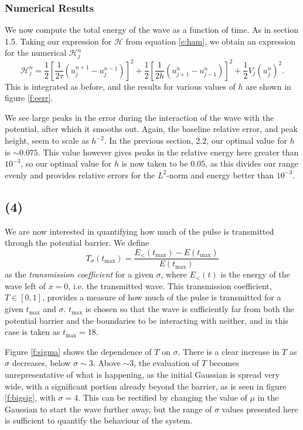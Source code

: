 \documentclass[10pt]{article}
\newcommand{\ujn}{u_{j}^{n}}
\newcommand{\ujpn}{u_{j+1}^{n}}
\newcommand{\ujmn}{u_{j-1}^{n}}
\newcommand{\ujnp}{u_{j}^{n+1}}
\newcommand{\ujnm}{u_{j}^{n-1}}
\begin{document}
\subsubsection*{Numerical Results}
We now compute the total energy of the wave as a function of time. As in section
1.5.
Taking our expression for $\mathcal{H}$ from equation \ref{e:ham}, we obtain
an expression for the numerical $\mathcal{H}_j^n$
$$ \mathcal{H}_j^n = \frac{1}{2}\left[\frac{1}{2\tau}\left(\ujnp - \ujnm\right)\right]^2
+ \frac{1}{2}\left[ \frac{1}{2h} \left(\ujpn - \ujmn\right)\right]^2 +
\frac{1}{2}V_j\left(\ujn\right)^2.$$
This is integrated as before, and the results for various values of $h$ are shown in
figure \ref{f:eerr}.

We see large peaks in the error during the interaction of the wave with the potential, after which it smooths
out. Again, the baseline relative error, and peak height, seem to scale as $h^{-2}$.
In the previous section, 2.2, our optimal value for $h$ is $\sim 0.075$. This value however gives peaks in the
relative energy here greater than $10^{-3}$, so our optimal value for $h$ is now taken to be $0.05$, as this
divides our range evenly and provides relative errors for the $L^2$-norm and energy better than $10^{-3}$.

\clearpage
\subsection*{(4)}
We are now interested in quantifying how much of the pulse is transmitted through
the potential barrier. We define
\begin{equation}
T_\sigma(t_\text{max}) = \frac{E_<(t_\text{max}) - E(t_\text{max})}{E(t_\text{max})}
\label{e:T}
\end{equation}
as the {\it transmission coefficient} for a given $\sigma$,
where $E_<(t)$ is the energy of the wave left of $x=0$, i.e. the transmitted wave.
This transmission coefficient, $T\in[0,1]$, provides a measure of how much of the pulse
is transmitted for a given $t_\text{max}$ and $\sigma$.
$t_\text{max}$ is chosen so that the wave is sufficiently far from both the potential
barrier and the boundaries to be interacting with neither, and in this case is taken as
$t_\text{max} = 18$.

Figure \ref{f:sigma} shows the dependence of $T$ on $\sigma$. There is a clear
increase in $T$ as $\sigma$ decreases, below $\sigma \sim 3$. Above $\sim 3$,
the evaluation of $T$ becomes unrepresentative of what is happening, as
the initial Gaussian is spread very wide, with a significant portion already beyond
the barrier, as is seen in figure \ref{f:bigsig}, with $\sigma = 4$.
This can be rectified by changing the value of $\mu$ in the Gaussian to start the
wave further away, but the range of $\sigma$ values presented here is sufficient
to quantify the behaviour of the system.
\end{document}
